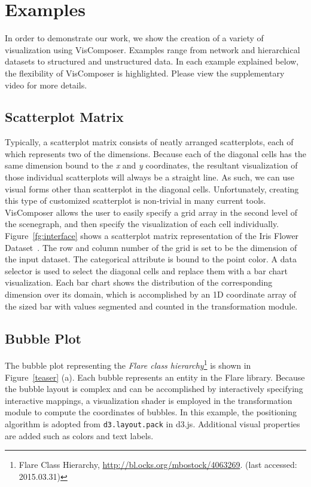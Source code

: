 \section{Examples}
\label{sec:examples}
In order to demonstrate our work, we show the creation of a variety of visualization using VisComposer.  Examples range from network and hierarchical datasets to structured and unstructured data. In each example explained below, the flexibility of VisComposer is highlighted. Please view the supplementary video for more details.

\subsection{Scatterplot Matrix}
Typically, a scatterplot matrix consists of neatly arranged scatterplots, each of which represents two of the dimensions. Because each of the diagonal cells has the same dimension bound to the \emph{x} and \emph{y} coordinates, the resultant visualization of those individual scatterplots will always be a straight line.  As such, we can use visual forms other than scatterplot  in the diagonal cells. Unfortunately, creating this type of customized scatterplot is non-trivial in many current tools. VisComposer allows the user to easily specify a grid array in the second level of the scenegraph, and then specify the visualization of each cell individually. Figure~\ref{fg:interface} shows a scatterplot matrix representation of the Iris Flower Dataset~\cite{IrisDataset}. The row and column number of the grid is set to be the dimension of the input dataset. The categorical attribute is bound to the point color. A data selector is used to select the diagonal cells and replace them with a bar chart visualization. Each bar chart shows the distribution of the corresponding dimension over its domain, which is accomplished by an 1D coordinate array of the sized bar with values segmented and counted in the transformation module.


\subsection{Bubble Plot}
The bubble plot representing the \emph{Flare class hierarchy}\footnote{Flare Class Hierarchy, \url{http://bl.ocks.org/mbostock/4063269}. (last accessed: 2015.03.31)} is shown in Figure~\ref{teaser} (a). Each bubble represents an entity in the Flare library. Because the bubble layout is complex and can be accomplished by interactively specifying interactive mappings, a visualization shader is employed in the transformation module to compute the coordinates of bubbles. In this example, the positioning algorithm is adopted from \texttt{d3.layout.pack} in d3.js. Additional visual properties are added such as colors and text labels.


